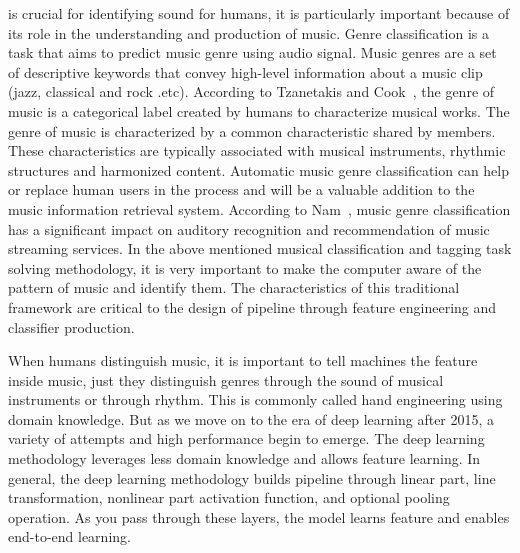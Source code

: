 \documentclass[journal]{IEEEtran}
\begin{document}

 is crucial for identifying sound for humans, it is particularly important because of its role in the understanding and production of music.
Genre classification is a task that aims to predict music genre using audio signal.
Music genres are a set of descriptive keywords that convey high-level information about a music clip (jazz, classical and rock .etc).
According to Tzanetakis and Cook~\cite{tzanetakis2002musical}, the genre of music is a categorical label created by humans to characterize musical works.
The genre of music is characterized by a common characteristic shared by members.
These characteristics are typically associated with musical instruments, rhythmic structures and harmonized content.
Automatic music genre classification can help or replace human users in the process and will be a valuable addition to the music information retrieval system.
According to Nam~\cite{nam2018deep}, music genre classification has a significant impact on auditory recognition and recommendation of music streaming services.
In the above mentioned musical classification and tagging task solving methodology, it is very important to make the computer aware of the pattern of music and identify them.
The characteristics of this traditional framework are critical to the design of pipeline through feature engineering and classifier production.

When humans distinguish music, it is important to tell machines the feature inside music, just they distinguish genres through the sound of musical instruments or through rhythm.
This is commonly called hand engineering using domain knowledge.
But as we move on to the era of deep learning after 2015, a variety of attempts and high performance begin to emerge.
The deep learning methodology leverages less domain knowledge and allows feature learning.
In general, the deep learning methodology builds pipeline through linear part, line transformation, nonlinear part activation function, and optional pooling operation.
As you pass through these layers, the model learns feature and enables end-to-end learning.
\end{document}
